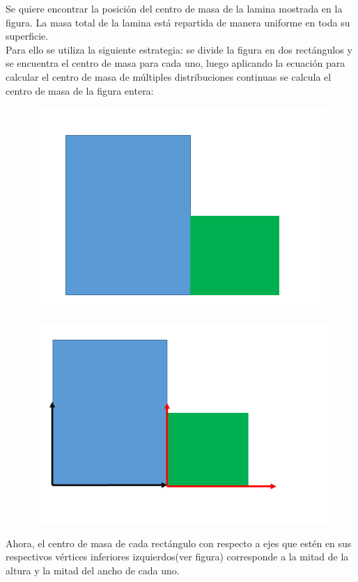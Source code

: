 \documentclass[a4paper,11pt]{article}
\begin{document}
Se quiere encontrar la posición del centro de masa de la lamina mostrada en la figura. La masa total
de la lamina está repartida de manera uniforme en toda su superficie. \\

Para ello se utiliza la siguiente estrategia: se divide la figura en dos rectángulos y se encuentra el centro de masa para cada uno, luego aplicando la ecuación para calcular el centro de masa de múltiples distribuciones continuas se calcula el centro de masa de la figura entera:


\begin{figure}
	\includegraphics[scale=0.5]{./im/recdiv}
\end{figure}



\begin{figure}
	\includegraphics[scale=0.5]{./im/vert}
\end{figure}
Ahora, el centro de masa de cada rectángulo con respecto a ejes que estén en sus respectivos vértices inferiores izquierdos(ver figura) corresponde a la mitad de la altura y la mitad del ancho de cada uno.
\end{document}
